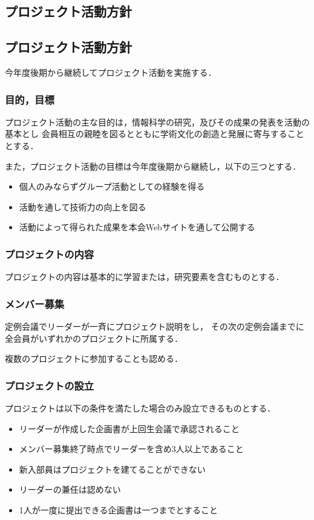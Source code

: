 \subsection*{プロジェクト活動方針}

\subsection*{プロジェクト活動方針}
今年度後期から継続してプロジェクト活動を実施する．

\subsubsection*{目的，目標}
プロジェクト活動の主な目的は，情報科学の研究，及びその成果の発表を活動の基本とし
会員相互の親睦を図るとともに学術文化の創造と発展に寄与することとする．

また，プロジェクト活動の目標は今年度後期から継続し，以下の三つとする．

\begin{itemize}
\item 個人のみならずグループ活動としての経験を得る
\item 活動を通して技術力の向上を図る
\item 活動によって得られた成果を本会Webサイトを通して公開する
\end{itemize}


\subsubsection*{プロジェクトの内容}
プロジェクトの内容は基本的に学習または，研究要素を含むものとする．

\subsubsection*{メンバー募集}
定例会議でリーダーが一斉にプロジェクト説明をし，
その次の定例会議までに全会員がいずれかのプロジェクトに所属する．

複数のプロジェクトに参加することも認める．

\subsubsection*{プロジェクトの設立}
プロジェクトは以下の条件を満たした場合のみ設立できるものとする．

\begin{itemize}
\item リーダーが作成した企画書が上回生会議で承認されること
\item メンバー募集終了時点でリーダーを含め3人以上であること
\item 新入部員はプロジェクトを建てることができない
\item リーダーの兼任は認めない
\item 1人が一度に提出できる企画書は一つまでとすること
\end{itemize}

